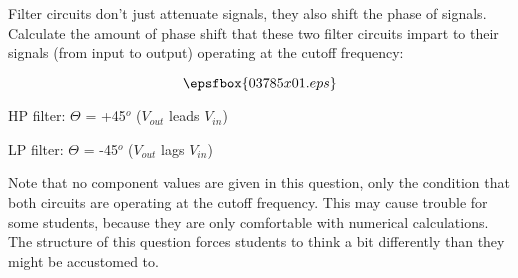 

Filter circuits don't just attenuate signals, they also shift the phase of signals.  Calculate the amount of phase shift that these two filter circuits impart to their signals (from input to output) operating at the cutoff frequency:

$$\epsfbox{03785x01.eps}$$







HP filter: $\Theta$ = +45$^{o}$ ($V_{out}$ leads $V_{in}$)

\vskip 10pt

LP filter: $\Theta$ = -45$^{o}$ ($V_{out}$ lags $V_{in}$)







Note that no component values are given in this question, only the condition that both circuits are operating at the cutoff frequency.  This may cause trouble for some students, because they are only comfortable with numerical calculations.  The structure of this question forces students to think a bit differently than they might be accustomed to.




